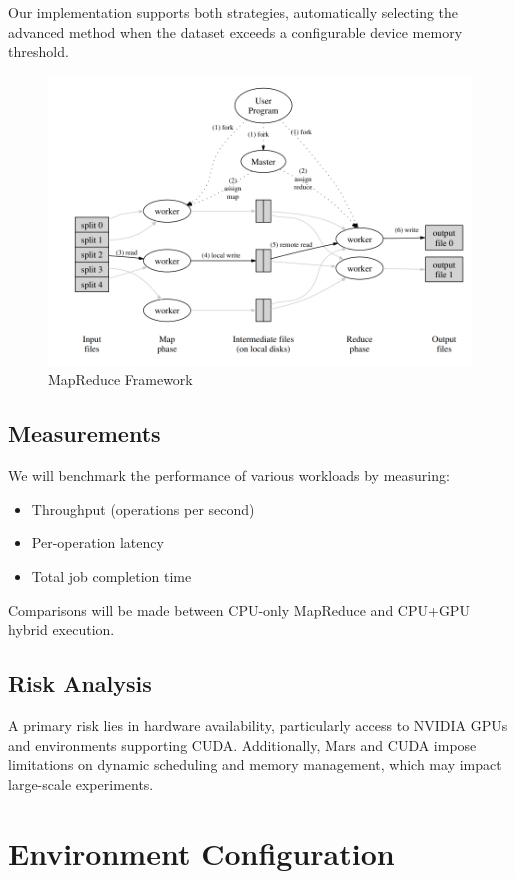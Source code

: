 \documentclass{article}
\begin{document}
Our implementation supports both strategies, automatically selecting the advanced method when the dataset exceeds a configurable device memory threshold.

\begin{figure}[ht]
    \centering
    \includegraphics[width=1\linewidth]{./images/mapreduce.png}
    \caption{MapReduce Framework \cite{mapreduce}}
    \label{fig:mapreduce}
\end{figure}

\subsection{Measurements}
We will benchmark the performance of various workloads by measuring:
\begin{itemize}
    \item Throughput (operations per second)
    \item Per-operation latency
    \item Total job completion time
\end{itemize}

Comparisons will be made between CPU-only MapReduce and CPU+GPU hybrid execution.

\subsection{Risk Analysis}
A primary risk lies in hardware availability, particularly access to NVIDIA GPUs and environments supporting CUDA. Additionally, Mars and CUDA impose limitations on dynamic scheduling and memory management, which may impact large-scale experiments.

\section{Environment Configuration}
\end{document}
